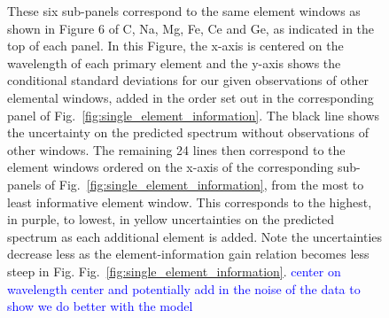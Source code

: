 \documentclass[a4paper,fleqn,usenatbib]{mnras}
\begin{document}
\begin{figure}
    \caption{These six sub-panels correspond to the same element windows as shown in Figure 6 of C, Na, Mg, Fe, Ce and Ge, as indicated in the top of each panel. In this Figure, the x-axis is centered on the wavelength of each primary element and the y-axis shows the conditional standard deviations for our  given observations of other elemental windows, added in the order set out in the corresponding panel of Fig.~\ref{fig:single_element_information}. The black line shows the uncertainty on the predicted spectrum without observations of other windows. The remaining 24 lines then correspond to the element windows ordered on the x-axis of the corresponding sub-panels of Fig.~\ref{fig:single_element_information}, from the most to least informative element window. This corresponds to the highest, in purple, to lowest, in yellow uncertainties on the predicted spectrum as each additional element is added. Note the uncertainties decrease less as the element-information gain relation becomes less steep in Fig.  Fig.~\ref{fig:single_element_information}. \textcolor{blue}{center on wavelength center and potentially add in the noise of the data to show we do better with the model}}
    \label{fig:single_element_errs}
\end{figure}
\end{document}
